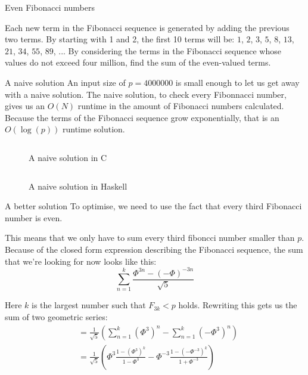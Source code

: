 \documentclass[main.tex]{subfiles}
\begin{document}
\begin{prob}{2}{Even Fibonacci numbers}
  \begin{problem}
    Each new term in the Fibonacci sequence is generated by adding the previous two terms. By starting with 1 and 2, the first 10 terms will be: $1$, $2$, $3$, $5$, $8$, $13$, $21$, $34$, $55$, $89$, ...
    By considering the terms in the Fibonacci sequence whose values do not exceed four million, find the sum of the even-valued terms.
  \end{problem}
  \begin{solutions}
    \begin{solution}{A naive solution}
      An input size of $p=4000000$ is small enough to let us get away with a naive solution.
      The naive solution, to check every Fibonnacci number, gives us an $O(N)$ runtime in the amount of Fibonacci numbers calculated.
      Because the terms of the Fibonacci sequence grow exponentially, that is an $O(\log(p))$ runtime solution.

      \begin{figure}[H]
        \inputminted[firstline=16, lastline=34]{c}{\sol{002}{c}/naive.c}
        \caption{A naive solution in C}
      \end{figure}

      \begin{figure}[H]
        \inputminted[firstline=8, lastline=9]{haskell}{\sol{002}{haskell}/solution.hs}
        \caption{A naive solution in Haskell}
      \end{figure}

    \end{solution}
    \begin{solution}{A better solution}
      To optimise, we need to use the fact that every third Fibonacci number is even.

      This means that we only have to sum every third fiboncci number smaller than $p$.
      Because of the closed form expression describing the Fibonacci sequence, the sum that we're looking for now looks like this:
      \[ \sum_{n=1}^{k}\frac{\Phi^{3n} - (-\Phi)^{-3n}}{\sqrt{5}} \]

      Here $k$ is the largest number such that $F_{3k} < p$ holds.
      Rewriting this gets us the sum of two geometric series:
      \begin{align*}
        &= \frac{1}{\sqrt{5}}\left( \sum_{n=1}^{k}(\Phi^{3})^{n} - \sum_{n=1}^{k}(-\Phi^{3})^{n} \right)\\
        &= \frac{1}{\sqrt{5}}\left( \Phi^{3}\frac{1-\left(\Phi^{3}\right)^{k}}{1-\Phi^{3}} - \Phi^{-3}\frac{1-\left(-\Phi^{-3}\right)^{k}}{1+\Phi^{-3}} \right)
      \end{align*}


\end{solution}
\end{solutions}
\end{prob}
\end{document}
